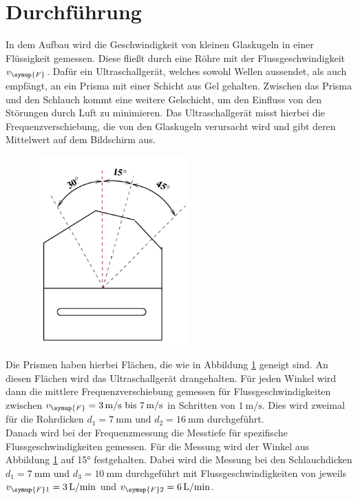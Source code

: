 \section{Durchführung}

    	In dem Aufbau wird die Geschwindigkeit von kleinen Glaskugeln in einer Flüssigkeit gemessen.
        Diese fließt durch eine Röhre mit der Flussgeschwindigkeit $v_{\symup{F}}$. Dafür ein
        Ultraschallgerät, welches sowohl Wellen aussendet, als auch empfängt, an ein Prisma mit
        einer Schicht aus Gel gehalten. Zwischen das Prisma und den Schlauch kommt eine weitere
        Gelschicht, um den Einfluss von den Störungen durch Luft zu minimieren. 
        Das Ultraschallgerät misst hierbei die Frequenzverschiebung, die von den Glaskugeln
        verursacht wird und gibt deren Mittelwert auf dem Bildschirm aus. \\

        \begin{figure}[H]
            \centering
            \includegraphics[width=6cm]{Bilder/winkel.png}
            \label{fig:winkel}       
        \end{figure}
        \noindent Die Prismen haben hierbei Flächen, die wie in Abbildung \ref{fig:winkel} geneigt sind.
        An diesen Flächen wird das Ultraschallgerät drangehalten. Für jeden Winkel wird dann die mittlere
        Frequenzverschiebung gemessen für Flussgeschwindigkeiten zwischen $v_{\symup{F}}=\qty{3}{\meter\per\second}\text{ bis }
        \qty{7}{\meter\per\second}$ in Schritten von $\qty{1}{\meter\per\second}$. Dies wird zweimal für die
        Rohrdicken $d_1=\qty{7}{\milli\meter}$ und $d_2=\qty{16}{\milli\meter}$ durchgeführt.\\
        \noindent Danach wird bei der Frequenzmessung die Messtiefe für spezifische Flussgeschwindigkeiten gemessen.
        Für die Messung wird der Winkel aus Abbildung \ref{fig:winkel} auf 15° festgehalten. Dabei wird die Messung
        bei den Schlauchdicken $d_1=\qty{7}{\milli\meter}$ und $d_3=\qty{10}{\milli\meter}$ durchgeführt mit 
        Flussgeschwindigkeiten von jeweils $v_{\symup{F}1}=\qty{3}{\liter\per\minute}$ und $v_{\symup{F}2}=\qty{6}{\liter\per\minute}$.
        
\label{sec:Durchführung}
